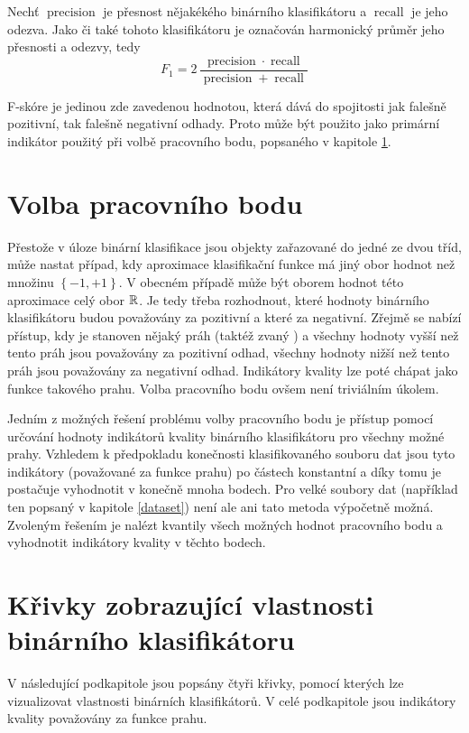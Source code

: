 \begin{define}
	Nechť \( \operatorname{precision} \) je přesnost nějakékého binárního klasifikátoru a \( \operatorname{recall} \) je jeho odezva. Jako  či také  tohoto klasifikátoru je označován harmonický průměr jeho přesnosti a odezvy, tedy
	\[ F_1 = 2 \, \frac{\operatorname{precision} \cdot \operatorname{recall}}{\operatorname{precision} + \operatorname{recall}} \]
\end{define}

F-skóre je jedinou zde zavedenou hodnotou, která dává do spojitosti jak falešně pozitivní, tak falešně negativní odhady. Proto může být použito jako primární indikátor použitý při volbě pracovního bodu, popsaného v kapitole \ref{continuous_aprox}.

\section{Volba pracovního bodu}\label{continuous_aprox}

Přestože v úloze binární klasifikace jsou objekty zařazované do jedné ze dvou tříd, může nastat případ, kdy aproximace klasifikační funkce má jiný obor hodnot než množinu \( \left\{ -1, +1 \right\} \). V obecném případě může být oborem hodnot této aproximace celý obor \( \mathbb R \). Je tedy třeba rozhodnout, které hodnoty binárního klasifikátoru budou považovány za pozitivní a které za negativní. Zřejmě se nabízí přístup, kdy je stanoven nějaký práh (taktéž zvaný ) a všechny hodnoty vyšší než tento práh jsou považovány za pozitivní odhad, všechny hodnoty nižší než tento práh jsou považovány za negativní odhad. Indikátory kvality lze poté chápat jako funkce takového prahu. Volba pracovního bodu ovšem není triviálním úkolem.

Jedním z možných řešení problému volby pracovního bodu je přístup pomocí určování hodnoty indikátorů kvality binárního klasifikátoru pro všechny možné prahy. Vzhledem k předpokladu konečnosti klasifikovaného souboru dat jsou tyto indikátory (považované za funkce prahu) po částech konstantní a díky tomu je postačuje vyhodnotit v konečně mnoha bodech. Pro velké soubory dat (například ten popsaný v kapitole \ref{dataset}) není ale ani tato metoda výpočetně možná. Zvoleným řešením je nalézt kvantily všech možných hodnot pracovního bodu a vyhodnotit indikátory kvality v těchto bodech.

\section{Křivky zobrazující vlastnosti binárního klasifikátoru}\label{evaluation_curves}
V následující podkapitole jsou popsány čtyři křivky, pomocí kterých lze vizualizovat vlastnosti binárních klasifikátorů. V celé podkapitole jsou indikátory kvality považovány za funkce prahu.

